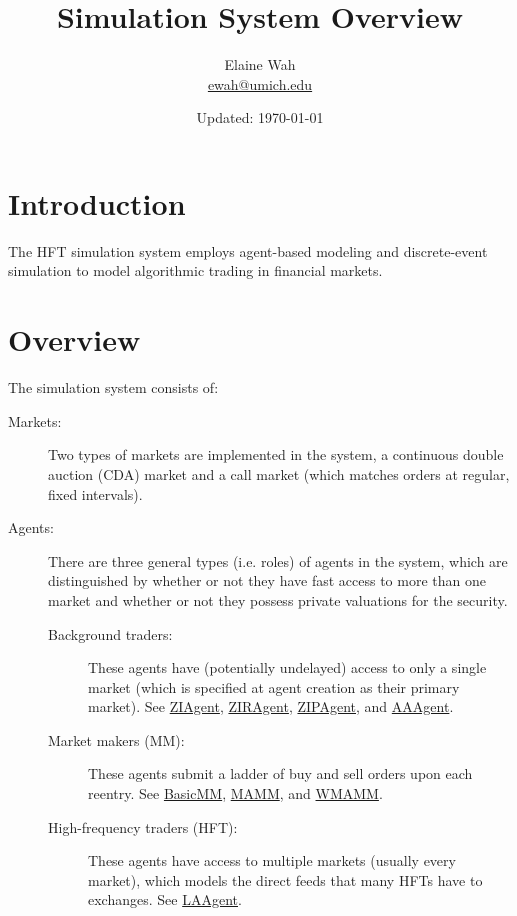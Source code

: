 \documentclass[11pt]{article}
\title{Simulation System Overview}
\author{
  Elaine Wah \\
  \href{mailto:ewah@umich.edu}{ewah@umich.edu}
}
\date{Updated: \today}
\begin{document}
\maketitle

\section{Introduction}

The HFT simulation system employs agent-based modeling and discrete-event simulation to model algorithmic trading in financial markets.

\section{Overview}

The simulation system consists of:
\begin{description}
\item[Markets:] Two types of markets are implemented in the system, a
  continuous double auction (CDA) market and a call market (which matches orders at regular, fixed
  intervals).

\item[Agents:] There are three general types (i.e. roles) of agents in the system,
  which are distinguished by whether or not they have fast access to more than
  one market and whether or not they possess private valuations for the security.

\begin{description}
\item[Background traders:] These agents have (potentially
  undelayed) access to only a single market (which is specified at agent creation as their primary market). See
  \href{../src/entity/agent/ZIAgent.java}{\textsf{ZIAgent}}, \href{../src/entity/agent/ZIRAgent.java}{\textsf{ZIRAgent}}, \href{../src/entity/agent/ZIPAgent.java}{\textsf{ZIPAgent}}, and \href{../src/entity/agent/AAAgent.java}{\textsf{AAAgent}}.

\item[Market makers (MM):] These agents submit a ladder of buy and sell orders upon each reentry. See
  \href{../src/entity/agent/BasicMarketMaker.java}{\textsf{BasicMM}},
  \href{../src/entity/agent/MAMarketMaker.java}{\textsf{MAMM}}, and
  \href{../src/entity/agent/WMAMarketMaker.java}{\textsf{WMAMM}}.

\item[High-frequency traders (HFT):] These agents have access to
  multiple markets (usually every market), which models the
  direct feeds that many HFTs have to exchanges. See \href{../src/entity/agent/LAAgent.java}{\textsf{LAAgent}}.
\end{description}
\end{description}
\end{document}
